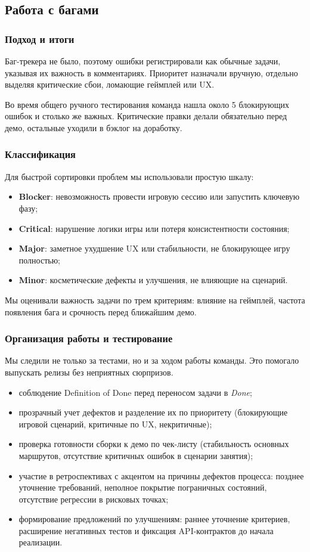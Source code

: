 \subsection{Работа с багами} 
\subsubsection{Подход и итоги} 
Баг-трекера не было, поэтому ошибки регистрировали как обычные задачи, указывая их важность в комментариях. Приоритет назначали вручную, отдельно выделяя критические сбои, ломающие геймплей или UX.

Во время общего ручного тестирования команда нашла около 5 блокирующих ошибок и столько же важных. Критические правки делали обязательно перед демо, остальные уходили в бэклог на доработку. 

\subsubsection{Классификация} 
Для быстрой сортировки проблем мы использовали простую шкалу:

\begin{itemize}
    \item \textbf{Blocker}: невозможность провести игровую сессию или запустить ключевую фазу;
    \item \textbf{Critical}: нарушение логики игры или потеря консистентности состояния;
    \item \textbf{Major}: заметное ухудшение UX или стабильности, не блокирующее игру полностью;
    \item \textbf{Minor}: косметические дефекты и улучшения, не влияющие на сценарий.
\end{itemize} 
Мы оценивали важность задачи по трем критериям: влияние на геймплей, частота появления бага и срочность перед ближайшим демо. 

\subsubsection{Организация работы и тестирование}
Мы следили не только за тестами, но и за ходом работы команды. Это помогало выпускать релизы без неприятных сюрпризов.

\begin{itemize}
    \item соблюдение Definition of Done перед переносом задачи в \textit{Done};
    \item прозрачный учет дефектов и разделение их по приоритету (блокирующие игровой сценарий, критичные по UX, некритичные);
    \item проверка готовности сборки к демо по чек-листу (стабильность основных маршрутов, отсутствие критичных ошибок в сценарии занятия);
    \item участие в ретроспективах с акцентом на причины дефектов процесса: позднее уточнение требований, неполное покрытие пограничных состояний, отсутствие регрессии в рисковых точках;
    \item формирование предложений по улучшениям: раннее уточнение критериев, расширение негативных тестов и фиксация API-контрактов до начала реализации.
\end{itemize}

